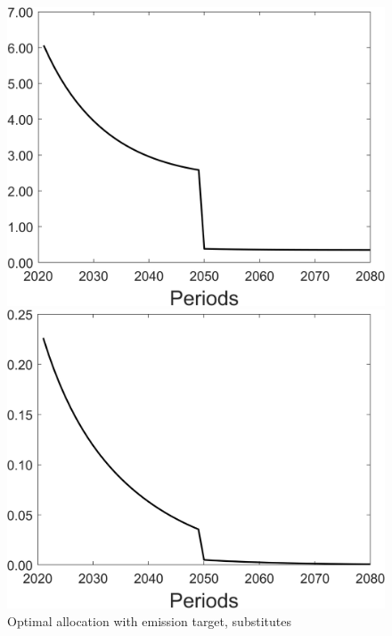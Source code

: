 \newpage
\begin{figure}[h!!]
	\centering
	\caption{Optimal allocation with emission target, substitutes }\label{fig:optallo_subs_onlyR}
	\begin{minipage}[]{0.32\textwidth}
		\includegraphics[width=1\textwidth]{../../codding_model/Own/figures/Rep_agent/staticonlyRam_separate_c_periods59_eppsilon4.00_zeta1.40_Ad08_Ac04_thetac0.70_thetad0.56_HetGrowth1_tauul0.181_util0_withtarget1_lgd0.png}
	\end{minipage}
	\begin{minipage}[]{0.32\textwidth}
		\includegraphics[width=1\textwidth]{../../codding_model/Own/figures/Rep_agent/staticonlyRam_separate_hh_periods59_eppsilon4.00_zeta1.40_Ad08_Ac04_thetac0.70_thetad0.56_HetGrowth1_tauul0.181_util0_withtarget1_lgd0.png}

\end{minipage}
\end{figure}
